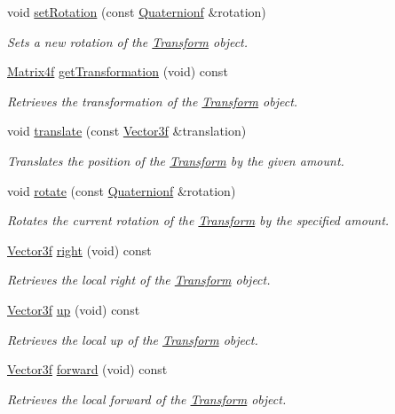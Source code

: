 \begin{DoxyCompactItemize}
void \hyperlink{classsparky_1_1_transform_a870405b2aa4bd13ffa48a8e072f7bf3b}{set\+Rotation} (const \hyperlink{classsparky_1_1_quaternion}{Quaternionf} \&rotation)
\begin{DoxyCompactList}\small\item\em Sets a new rotation of the \hyperlink{classsparky_1_1_transform}{Transform} object. \end{DoxyCompactList}\item 
\hyperlink{classsparky_1_1_matrix4}{Matrix4f} \hyperlink{classsparky_1_1_transform_aa5c5aa2ded3b97e4f55a927e7b8f9bbf}{get\+Transformation} (void) const 
\begin{DoxyCompactList}\small\item\em Retrieves the transformation of the \hyperlink{classsparky_1_1_transform}{Transform} object. \end{DoxyCompactList}\item 
void \hyperlink{classsparky_1_1_transform_a2abf650641e50055dffaf6c11e4e5b79}{translate} (const \hyperlink{classsparky_1_1_vector3}{Vector3f} \&translation)
\begin{DoxyCompactList}\small\item\em Translates the position of the \hyperlink{classsparky_1_1_transform}{Transform} by the given amount. \end{DoxyCompactList}\item 
void \hyperlink{classsparky_1_1_transform_af3b667562451c1cd254bb7708d15a2ce}{rotate} (const \hyperlink{classsparky_1_1_quaternion}{Quaternionf} \&rotation)
\begin{DoxyCompactList}\small\item\em Rotates the current rotation of the \hyperlink{classsparky_1_1_transform}{Transform} by the specified amount. \end{DoxyCompactList}\item 
\hyperlink{classsparky_1_1_vector3}{Vector3f} \hyperlink{classsparky_1_1_transform_a50d2ed69775d32d034cf604cd48400a5}{right} (void) const 
\begin{DoxyCompactList}\small\item\em Retrieves the local right of the \hyperlink{classsparky_1_1_transform}{Transform} object. \end{DoxyCompactList}\item 
\hyperlink{classsparky_1_1_vector3}{Vector3f} \hyperlink{classsparky_1_1_transform_aae0c78bdcabf3980bd20c1b45b58ca57}{up} (void) const 
\begin{DoxyCompactList}\small\item\em Retrieves the local up of the \hyperlink{classsparky_1_1_transform}{Transform} object. \end{DoxyCompactList}\item 
\hyperlink{classsparky_1_1_vector3}{Vector3f} \hyperlink{classsparky_1_1_transform_ad8cc87e8a055e05c54ea0ead03376b21}{forward} (void) const 
\begin{DoxyCompactList}\small\item\em Retrieves the local forward of the \hyperlink{classsparky_1_1_transform}{Transform} object. \end{DoxyCompactList}\end{DoxyCompactItemize}


